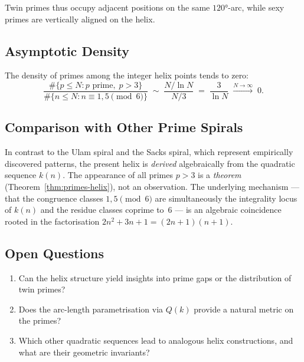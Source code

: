 Twin primes thus occupy adjacent positions on the same $120°$-arc,
while sexy primes are vertically aligned on the helix.

\subsection{Asymptotic Density}

\begin{proposition}\label{prop:density}
The density of primes among the integer helix points tends to zero:
\[
  \frac{\#\{p \leq N : p \text{ prime},\; p > 3\}}
       {\#\{n \leq N : n \equiv 1, 5 \pmod{6}\}}
  \;\sim\; \frac{N/\ln N}{N/3}
  \;=\; \frac{3}{\ln N}
  \;\xrightarrow{N\to\infty}\; 0.
\]
\end{proposition}

\subsection{Comparison with Other Prime Spirals}

\begin{remark}
In contrast to the Ulam spiral and the Sacks spiral, which represent
empirically discovered patterns, the present helix is \emph{derived}
algebraically from the quadratic sequence $k(n)$. The appearance of all
primes $p > 3$ is a \emph{theorem} (Theorem~\ref{thm:primes-helix}),
not an observation. The underlying mechanism --- that the congruence
classes $1, 5 \pmod{6}$ are simultaneously the integrality locus of
$k(n)$ and the residue classes coprime to~$6$ --- is an algebraic
coincidence rooted in the factorisation
$2n^2+3n+1 = (2n+1)(n+1)$.
\end{remark}

\subsection{Open Questions}

\begin{enumerate}
  \item Can the helix structure yield insights into prime gaps or the
    distribution of twin primes?
  \item Does the arc-length parametrisation via $Q(k)$ provide a
    natural metric on the primes?
  \item Which other quadratic sequences lead to analogous helix
    constructions, and what are their geometric invariants?
\end{enumerate}
